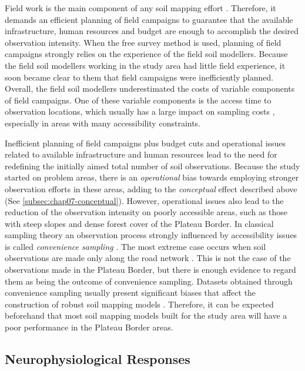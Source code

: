 Field work is the main component of any soil mapping effort \cite{KempenEtAl2012}. Therefore, it demands an 
efficient planning of field campaigns to guarantee that the available infrastructure, human resources and 
budget are enough to accomplish the desired observation intensity. When the free survey method is used, 
planning of field campaigns strongly relies on the experience of the field soil modellers. Because the 
field soil modellers working in the study area had little field experience, it soon became clear to them
that field campaigns were inefficiently planned. Overall, the field soil modellers underestimated the costs of
variable components of field campaigns. One of these variable components is the access time to observation 
locations, which usually has a large impact on sampling costs \cite{DomburgEtAl1997}, especially in areas with 
many accessibility constraints.

Inefficient planning of field campaigns plus budget cuts and operational issues related to available 
infrastructure and human resources lead to the need for redefining the initially aimed total number of soil 
observations. Because the study started on problem areas, there is an \emph{operational} bias towards employing
stronger observation efforts in these areas, adding to the \emph{conceptual} effect described above (See 
\autoref{subsec:chap07-conceptual}). However, operational issues also lead to the reduction of the 
observation intensity on poorly accessible areas, such as those with steep slopes and dense forest cover of 
the Plateau Border. In classical sampling theory an observation process strongly influenced by accessibility 
issues is called \emph{convenience sampling} \cite{deGruijterEtAl2006}. The most extreme case occurs when soil 
observations are made only along the road network \cite{CambuleEtAl2013}. This is not the case of the 
observations made in the Plateau Border, but there is enough evidence to regard them as being the outcome of 
convenience sampling. Datasets obtained through convenience sampling usually present significant biases that 
affect the construction of robust soil mapping models \cite{BrusEtAl2011}. Therefore, it can be expected 
beforehand that most soil mapping models built for the study area will have a poor performance in the Plateau 
Border areas.

\subsection{Neurophysiological Responses}


